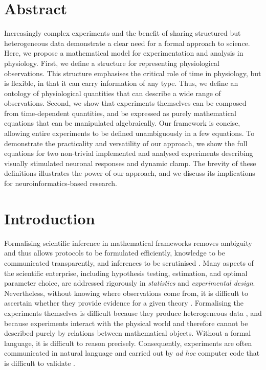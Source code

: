 
\section*{Abstract}

Increasingly complex experiments and the benefit of sharing structured
but heterogeneous data demonstrate a clear need for a formal approach
to science.  Here, we propose a mathematical model for
experimentation and analysis in physiology. First, we define a
structure for representing physiological observations. This structure
emphasises the critical role of time in physiology, but is flexible,
in that it can carry information of any type. Thus, we define an
ontology of physiological quantities that can describe a wide range of
observations. Second, we show that experiments themselves can be
composed from time-dependent quantities, and be expressed as purely
mathematical equations that can be manipulated algebraically. Our
framework is concise, allowing entire experiments to be defined
unambiguously in a few equations. To demonstrate the practicality and
versatility of our approach, we show the full equations for two
non-trivial implemented and analysed experiments describing visually
stimulated neuronal responses and dynamic clamp. The brevity of these
definitions illustrates the power of our approach, and we discuss its
implications for neuroinformatics-based research.

\pagebreak

%

\section*{Introduction}

Formalising scientific inference in mathematical frameworks removes
ambiguity and thus allows protocols to be formulated efficiently,
knowledge to be communicated transparently, and inferences to be
scrutinised \citep{Soldatova2006, Jaynes2003, Krantz1971}. Many
aspects of the scientific enterprise, including hypothesis testing,
estimation, and optimal parameter choice, are addressed rigorously in
\emph{statistics} and \emph{experimental design}. Nevertheless,
without knowing where observations come from, it is difficult to
ascertain whether they provide evidence for a given theory
\citep{Pool2002,MacKenzie-Graham2008,VanHorn2009}. Formalising the
experiments themselves is difficult because they produce heterogeneous
data \citep{Tukey1962}, and because experiments interact with the
physical world and therefore cannot be described purely by relations
between mathematical objects. Without a formal language, it is
difficult to reason precisely. Consequently, experiments are often
communicated in natural language and carried out by \emph{ad hoc}
computer code that is difficult to validate \citep{Baggerly2009, Merali2010}. 

